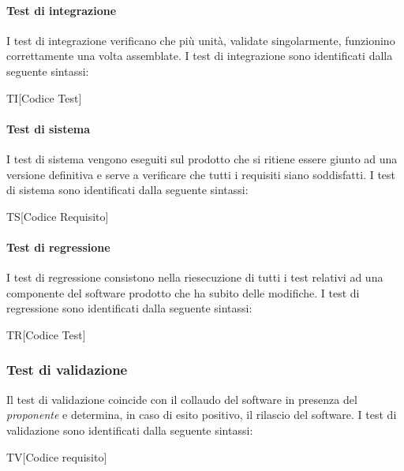 \paragraph{Test di integrazione}
I test di integrazione verificano che più unità, validate singolarmente, funzionino
correttamente una volta assemblate. I test di integrazione sono identificati dalla seguente sintassi:
\begin{center}
  TI[Codice Test]
\end{center}

\paragraph{Test di sistema}
I test di sistema vengono eseguiti sul prodotto che si ritiene essere giunto ad
una versione definitiva e serve a verificare che tutti i requisiti siano soddisfatti. I test di sistema sono identificati dalla seguente sintassi:
\begin{center}
  TS[Codice Requisito]
\end{center}

\paragraph{Test di regressione}
I test di regressione consistono nella riesecuzione di tutti i test relativi ad una
componente del software prodotto che ha subito delle modifiche. I test di regressione sono identificati dalla seguente sintassi:
\begin{center}
  TR[Codice Test]
\end{center}




\subsubsection{Test di validazione}
Il test di validazione coincide con il collaudo del software in presenza del \textit{proponente} e determina, in caso di esito positivo, il rilascio del software. I test di validazione sono identificati dalla seguente sintassi:
\begin{center}
  TV[Codice requisito]
\end{center}

